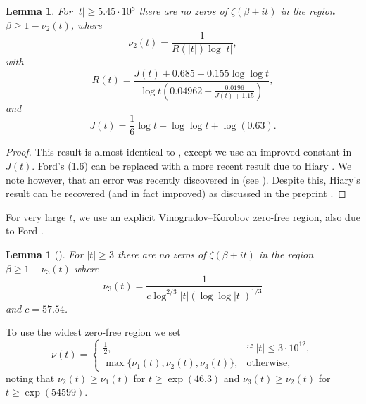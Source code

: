 \documentclass[reqno]{amsart}
\newtheorem{lemma}[theorem]{Lemma}
\numberwithin{equation}{section}
\theoremstyle{remark}
\begin{document}
\begin{lemma}\label{fordclassicregion}
    For $|t|\geq 5.45\cdot 10^8$ there are no zeros of $\zeta(\beta+it)$ in the region $\beta\geq 1-\nu_2(t)$, where
    \begin{equation*}
       \nu_2(t)=\frac{1}{R(|t|)\log |t|},
    \end{equation*}
    with
    \begin{equation*}
        R(t)=\frac{J(t)+0.685+0.155\log\log t}{\log t\left(0.04962-\frac{0.0196}{J(t)+1.15}\right)},
    \end{equation*}
    and
    \begin{equation*}
        J(t)=\frac{1}{6}\log t+\log\log t+\log(0.63).
    \end{equation*}
\end{lemma}
\begin{proof}
    This result is almost identical to \cite[Theorem 3]{Ford_2002}, except we use an improved constant in $J(t)$. Ford's (1.6) can be replaced with a more recent result due to Hiary \cite[Theorem 1.1]{hiary2016explicit}. We note however, that an error was recently discovered in \cite{hiary2016explicit} (see \cite[\S 2.2.1]{patel2021explicit}). Despite this, Hiary's result can be recovered (and in fact improved) as discussed in the preprint \cite{hiary2022improved}.
\end{proof}

For very large $t$, we use an explicit Vinogradov--Korobov zero-free region, also due to Ford \cite{Ford_2002}.

\begin{lemma}[{\cite[Theorem 5]{Ford_2002}}]\label{vklem}
    For $|t|\geq 3$ there are no zeros of $\zeta(\beta+it)$ in the region $\beta\geq 1-\nu_3(t)$ where
    \begin{equation}\label{vkregion}
        \nu_3(t)=\frac{1}{c\log^{2/3}|t|(\log\log |t|)^{1/3}}
    \end{equation}
    and $c=57.54$.
\end{lemma}

To use the widest zero-free region we set 
\begin{equation}\label{mainnueq}
    \nu(t)=
    \begin{cases}
        \frac{1}{2},&\text{if $|t|\leq 3\cdot 10^{12}$},\\
        \max\{\nu_1(t),\nu_2(t),\nu_3(t)\},&\text{otherwise,}
    \end{cases}    
\end{equation}
noting that $\nu_2(t)\geq\nu_1(t)$ for $t\geq\exp(46.3)$ and $\nu_3(t)\geq\nu_2(t)$ for $t\geq\exp(54599)$.
\end{document}
